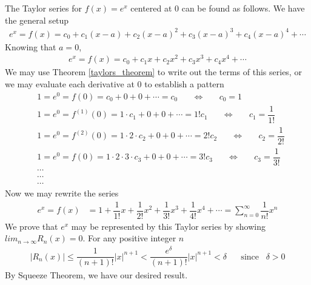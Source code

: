 \begin{example}
The Taylor series for $f(x) = e^{x}$ centered at $0$ can be found as follows. We have the general setup
\begin{align*}
    e^{x} = f(x) = c_{0} + c_{1} (x - a) + c_{2} (x - a)^{2} + c_{3} (x - a)^{3} + c_{4} (x - a)^{4} + \cdots 
\end{align*}
Knowing that $a = 0$,
\begin{align*}
    e^{x} = f(x) = c_{0} + c_{1}x + c_{2}x^{2} + c_{3}x^{3} + c_{4}x^{4} + \cdots 
\end{align*}
We may use Theorem \ref{taylors_theorem} to write out the terms of this series, or we may evaluate each derivative at $0$ to establish a pattern
\begin{align*}
    &1 = e^{0} = f(0) = c_{0} + 0 + 0 + \cdots = c_{0} \hspace{20pt} \Longleftrightarrow \hspace{20pt} c_{0} = 1\\[2ex]
    &1 = e^{0} = f^{(1)}(0) = 1 \cdot c_{1} + 0 + 0 + \cdots = 1!c_{1} \hspace{20pt} \Longleftrightarrow \hspace{20pt} c_{1} = \dfrac{1}{1!}\\[2ex]
    &1 = e^{0} = f^{(2)}(0) = 1 \cdot 2 \cdot c_{2} + 0 + 0 + \cdots = 2!c_{2} \hspace{20pt} \Longleftrightarrow \hspace{20pt} c_{2} = \dfrac{1}{2!}\\[2ex]
    &1 = e^{0} = f(0) = 1 \cdot 2 \cdot 3 \cdot c_{3} + 0 + 0 + \cdots = 3!c_{3} \hspace{20pt} \Longleftrightarrow \hspace{20pt} c_{3} = \dfrac{1}{3!}\\[1ex]
    &\cdots\\[1ex]
    &\cdots\\[1ex]
    &\cdots
\end{align*}
Now we may rewrite the series
\begin{align*}
    e^{x} = f(x) &= 1 + \dfrac{1}{1!}x + \dfrac{1}{2!}x^{2} + \dfrac{1}{3!}x^{3} + \dfrac{1}{4!}x^{4} + \cdots = \sum_{n=0}^{\infty} \dfrac{1}{n!}x^{n}
\end{align*}
We prove that $e^{x}$ may be represented by this Taylor series by showing $lim_{n \longrightarrow \infty}R_{n}(x) = 0$. For any positive integer $n$
\begin{align*}
    \lvert R_{n}(x) \rvert \leq \dfrac{1}{(n+1)!} \lvert x \rvert^{n+1} < \dfrac{e^{\delta}}{(n+1)!} \lvert x \rvert^{n+1} < \delta \hspace{20pt} \text{since} \hspace{10pt} \delta > 0
\end{align*}
By Squeeze Theorem, we have our desired result.
\end{example}